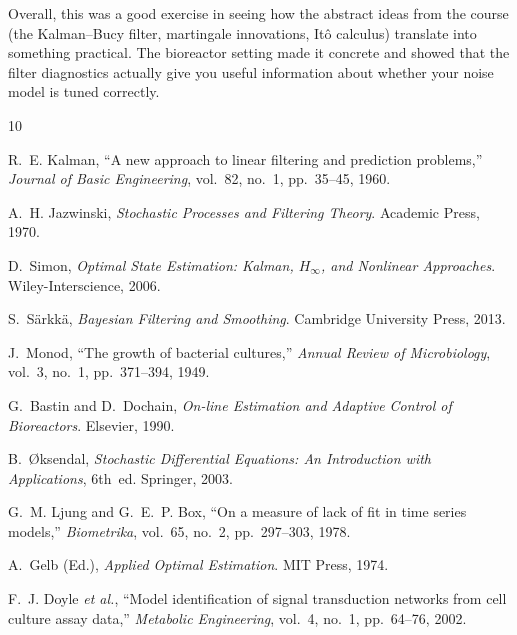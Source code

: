 \documentclass[11pt,letterpaper]{article}
\begin{document}
Overall, this was a good exercise in seeing how the abstract ideas from the course (the
Kalman--Bucy filter, martingale innovations, It\^{o} calculus) translate into something
practical. The bioreactor setting made it concrete and showed that the filter diagnostics
actually give you useful information about whether your noise model is tuned correctly.

\begin{thebibliography}{10}

R.~E. Kalman,
``A new approach to linear filtering and prediction problems,''
\textit{Journal of Basic Engineering}, vol.~82, no.~1, pp.~35--45, 1960.

A.~H. Jazwinski,
\textit{Stochastic Processes and Filtering Theory}.
Academic Press, 1970.

D.~Simon,
\textit{Optimal State Estimation: Kalman, $H_\infty$, and Nonlinear Approaches}.
Wiley-Interscience, 2006.

S.~S\"{a}rkk\"{a},
\textit{Bayesian Filtering and Smoothing}.
Cambridge University Press, 2013.

J.~Monod,
``The growth of bacterial cultures,''
\textit{Annual Review of Microbiology}, vol.~3, no.~1, pp.~371--394, 1949.

G.~Bastin and D.~Dochain,
\textit{On-line Estimation and Adaptive Control of Bioreactors}.
Elsevier, 1990.

B.~{\O}ksendal,
\textit{Stochastic Differential Equations: An Introduction with Applications}, 6th~ed.
Springer, 2003.

G.~M. Ljung and G.~E.~P. Box,
``On a measure of lack of fit in time series models,''
\textit{Biometrika}, vol.~65, no.~2, pp.~297--303, 1978.

A.~Gelb (Ed.),
\textit{Applied Optimal Estimation}.
MIT Press, 1974.

F.~J. Doyle \textit{et al.},
``Model identification of signal transduction networks from cell culture assay data,''
\textit{Metabolic Engineering}, vol.~4, no.~1, pp.~64--76, 2002.

\end{thebibliography}
\end{document}
